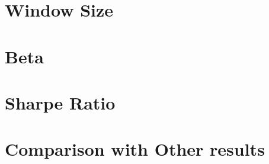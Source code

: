 

\section{Window Size}

\section{Beta}

\section{Sharpe Ratio}

\section{Comparison with Other results}

